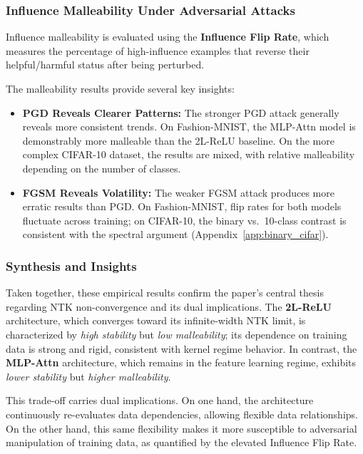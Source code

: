 \documentclass{article}
\theoremstyle{plain}
\theoremstyle{definition}
\theoremstyle{remark}
\begin{document}
\subsubsection{Influence Malleability Under Adversarial Attacks}

Influence malleability is evaluated using the \textbf{Influence Flip Rate}, which measures the percentage of high-influence examples that reverse their helpful/harmful status after being perturbed.

The malleability results provide several key insights:
\begin{itemize}
    \item \textbf{PGD Reveals Clearer Patterns:} The stronger PGD attack generally reveals more consistent trends. On Fashion-MNIST, the MLP-Attn model is demonstrably more malleable than the 2L-ReLU baseline. On the more complex CIFAR-10 dataset, the results are mixed, with relative malleability depending on the number of classes.

    \item \textbf{FGSM Reveals Volatility:} The weaker FGSM attack produces more erratic results than PGD. On Fashion-MNIST, flip rates for both models fluctuate across training; on CIFAR-10, the binary vs.\ 10-class contrast is consistent with the spectral argument (Appendix~\ref{app:binary_cifar}).
\end{itemize}

\subsubsection{Synthesis and Insights}

Taken together, these empirical results confirm the paper's central thesis regarding NTK non-convergence and its dual implications. The \textbf{2L-ReLU} architecture, which converges toward its infinite-width NTK limit, is characterized by \textit{high stability} but \textit{low malleability}; its dependence on training data is strong and rigid, consistent with kernel regime behavior. In contrast, the \textbf{MLP-Attn} architecture, which remains in the feature learning regime, exhibits \textit{lower stability} but \textit{higher malleability}.

This trade-off carries dual implications. On one hand, the architecture continuously re-evaluates data dependencies, allowing flexible data relationships. On the other hand, this same flexibility makes it more susceptible to adversarial manipulation of training data, as quantified by the elevated Influence Flip Rate.
\end{document}

